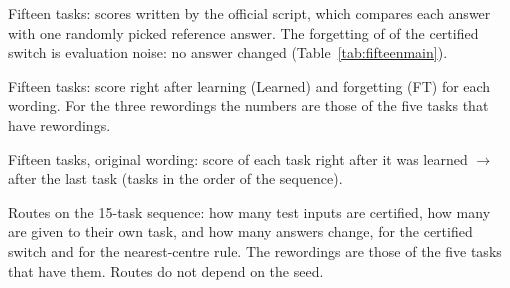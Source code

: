 \begin{table}[h]
  \caption{Fifteen tasks: scores written by the official script, which compares each answer with one
  randomly picked reference answer. The forgetting of \FifteenCertOffFT{} of the certified switch is
  evaluation noise: no answer changed (Table~\ref{tab:fifteenmain}).}
  \label{tab:fifteenofficial}
  \centering
  \small
  
\end{table}

\begin{table}[h]
  \caption{Fifteen tasks: score right after learning (Learned) and forgetting (FT) for each wording.
  For the three rewordings the numbers are those of the five tasks that have rewordings.}
  \label{tab:fifteenmore}
  \centering
  \small
  
\end{table}

\begin{table}[h]
  \caption{Fifteen tasks, original wording: score of each task right after it was learned $\to$ after
  the last task (tasks in the order of the sequence).}
  \label{tab:fifteenpertask}
  \centering
  \small
  
\end{table}

\begin{table}[h]
  \caption{Routes on the 15-task sequence: how many test inputs are certified, how many are given to
  their own task, and how many answers change, for the certified switch and for the nearest-centre
  rule. The rewordings are those of the five tasks that have them. Routes do not depend on the seed.}
  \label{tab:fifteenroutes}
  \centering
  \small
  \setlength{\tabcolsep}{3.5pt}
  
\end{table}
